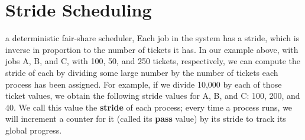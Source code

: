 \section*{Stride Scheduling}
a deterministic fair-share scheduler, Each job in the system has a stride, which is inverse in proportion to the number of tickets it has. In our example above, with jobs A, B, and C, with 100, 50, and 250 tickets,
respectively, we can compute the stride of each by dividing some large number by the number of tickets each process has been assigned. For example, if we divide 10,000 by each of those ticket values, we obtain the following stride values for A, B, and C: 100, 200, and 40. We call this value the \textbf{stride} of each process; every time a process runs, we will increment a counter for it (called its \textbf{pass} value) by its stride to track its global progress.

